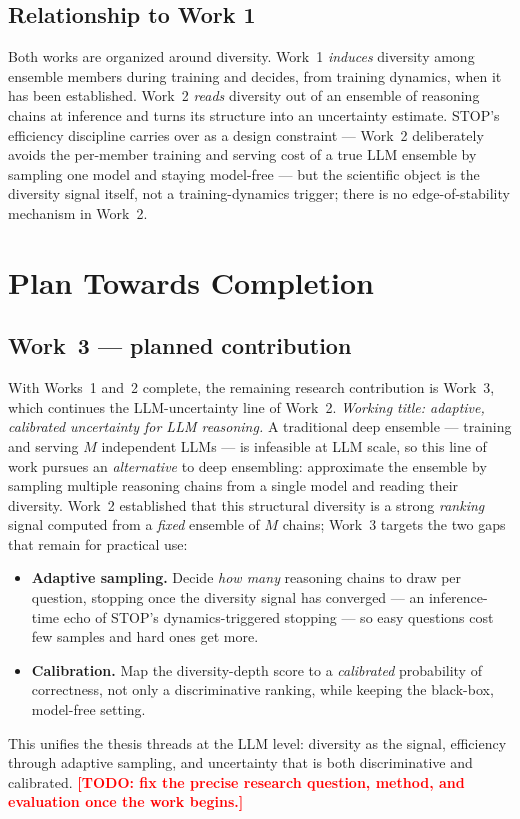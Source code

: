 \documentclass[11pt]{article}
\newcommand{\TODO}[1]{\textcolor{red}{\textbf{[TODO: #1]}}}
\begin{document}
\subsection{Relationship to Work 1}
Both works are organized around diversity. Work~1 \emph{induces} diversity among ensemble members
during training and decides, from training dynamics, when it has been established. Work~2
\emph{reads} diversity out of an ensemble of reasoning chains at inference and turns its structure
into an uncertainty estimate. STOP's efficiency discipline carries over as a design constraint ---
Work~2 deliberately avoids the per-member training and serving cost of a true LLM ensemble by
sampling one model and staying model-free --- but the scientific object is the diversity signal
itself, not a training-dynamics trigger; there is no edge-of-stability mechanism in Work~2.

\section{Plan Towards Completion}
\label{sec:plan}

\subsection{Work~3 --- planned contribution}
With Works~1 and~2 complete, the remaining research contribution is Work~3, which continues the
LLM-uncertainty line of Work~2. \emph{Working title: adaptive, calibrated uncertainty for LLM
reasoning.} A traditional deep ensemble --- training and serving $M$ independent LLMs --- is
infeasible at LLM scale, so this line of work pursues an \emph{alternative} to deep ensembling:
approximate the ensemble by sampling multiple reasoning chains from a single model and reading
their diversity. Work~2 established that this structural diversity is a strong \emph{ranking} signal
computed from a \emph{fixed} ensemble of $M$ chains; Work~3 targets the two gaps that remain for
practical use:
\begin{itemize}[itemsep=2pt]
  \item \textbf{Adaptive sampling.} Decide \emph{how many} reasoning chains to draw per question,
  stopping once the diversity signal has converged --- an inference-time echo of STOP's
  dynamics-triggered stopping --- so easy questions cost few samples and hard ones get more.
  \item \textbf{Calibration.} Map the diversity-depth score to a \emph{calibrated} probability of
  correctness, not only a discriminative ranking, while keeping the black-box, model-free setting.
\end{itemize}
This unifies the thesis threads at the LLM level: diversity as the signal, efficiency through
adaptive sampling, and uncertainty that is both discriminative and calibrated.
\TODO{fix the precise research question, method, and evaluation once the work begins.}
\end{document}
